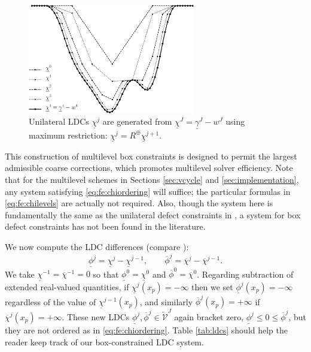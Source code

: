\documentclass[letterpaper,final,12pt,reqno]{amsart}
\theoremstyle{cstyle}
\theoremstyle{cstyle*}
\theoremstyle{dstyle}
\numberwithin{equation}{section}
\numberwithin{figure}{section}
\numberwithin{table}{section}
\numberwithin{theorem}{section}
\newcommand{\maxR}{R^{\bm{\oplus}}}
\begin{document}
\begin{figure}[ht]
\includegraphics[width=0.65\textwidth]{fixfigs/chiphilevels.pdf}
\caption{Unilateral LDCs $\underline{\chi}^j$ are generated from $\underline{\chi}^J = \underline{\gamma}^J - w^J$ using maximum restriction: $\underline{\chi}^j = \maxR \underline{\chi}^{j+1}$.}
\label{fig:chiphilevels}
\end{figure}

This construction of multilevel box constraints is designed to permit the largest admissible coarse corrections, which promotes multilevel solver efficiency.  Note that for the multilevel schemes in Sections \ref{sec:vcycle} and \ref{sec:implementation}, any system satisfying \eqref{eq:fe:chiordering} will suffice; the particular formulas in \eqref{eq:fe:chilevels} are actually not required.  Also, though the system here is fundamentally the same as the unilateral defect constraints in \cite{GraeserKornhuber2009}, a system for box defect constraints has not been found in the literature.

We now compute the LDC differences (compare \cite{GraeserKornhuber2009}):
\begin{equation}
\underline{\phi}^j = \underline{\chi}^j - \underline{\chi}^{j-1}, \qquad \overline{\phi}^j = \overline{\chi}^j - \overline{\chi}^{j-1}.  \label{eq:fe:philevels}
\end{equation}
We take $\underline{\chi}^{-1}=\overline{\chi}^{-1}=0$ so that $\underline{\phi}^0=\underline{\chi}^0$ and $\overline{\phi}^0=\overline{\chi}^0$.  Regarding subtraction of extended real-valued quantities, if $\underline{\chi}^j(x_p)=-\infty$ then we set $\underline{\phi}^j(x_p)=-\infty$ regardless of the value of $\underline{\chi}^{j-1}(x_p)$, and similarly $\overline{\phi}^j(x_p)=+\infty$ if $\overline{\chi}^j(x_p)=+\infty$.  These new LDCs $\underline{\phi}^{j},\overline{\phi}^{j} \in \tilde{\mathcal{V}}^J$ again bracket zero, $\underline{\phi}^j \le 0 \le \overline{\phi}^j$, but they are not ordered as in \eqref{eq:fe:chiordering}.  Table \ref{tab:ldcs} should help the reader keep track of our box-constrained LDC system.
\end{document}
